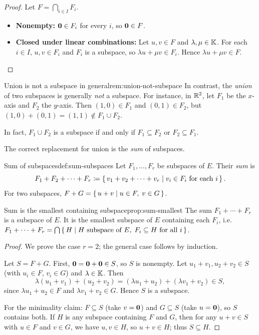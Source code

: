 \begin{proof}
Let $F = \bigcap_{i\in I} F_i$.
\begin{itemize}
  \item \textbf{Nonempty:} $\mathbf{0}\in F_i$ for every $i$, so
    $\mathbf{0}\in F$.
  \item \textbf{Closed under linear combinations:} Let $u,v\in F$ and
    $\lambda,\mu\in{\mathbb{K}}$. For each $i\in I$, $u,v\in F_i$ and $F_i$ is a
    subspace, so $\lambda u+\mu v\in F_i$. Hence
    $\lambda u+\mu v\in F$. \qedhere
\end{itemize}
\end{proof}

\begin{remark}{Union is not a subspace in general}{rem:union-not-subspace}
In contrast, the \emph{union} of two subspaces is generally \emph{not}
a subspace. For instance, in ${\mathbb{R}}^2$, let $F_1$ be the $x$-axis and $F_2$
the $y$-axis. Then $(1,0)\in F_1$ and $(0,1)\in F_2$, but
$(1,0)+(0,1)=(1,1)\notin F_1\cup F_2$.

In fact, $F_1\cup F_2$ is a subspace if and only if $F_1\subseteq F_2$
or $F_2\subseteq F_1$.
\end{remark}

The correct replacement for union is the \emph{sum} of subspaces.

\begin{definition}{Sum of subspaces}{def:sum-subspaces}
Let $F_1,\ldots,F_r$ be subspaces of $E$. Their \emph{sum} is
\[
  F_1 + F_2 + \cdots + F_r \coloneqq
  \left\{\,v_1 + v_2 + \cdots + v_r\;\middle|\;v_i\in F_i \text{ for each } i\,\right\}.
\]
For two subspaces, $F+G = \left\{\,u+v\;\middle|\;u\in F,\;v\in G\,\right\}$.
\end{definition}

\begin{proposition}{Sum is the smallest containing subspace}{prop:sum-smallest}
The sum $F_1+\cdots+F_r$ is a subspace of $E$. It is the smallest
subspace of $E$ containing each $F_i$, i.e.\
$F_1+\cdots+F_r = \bigcap\left\{\,H\;\middle|\;H \text{ subspace of } E,\;
F_i\subseteq H \text{ for all } i\,\right\}$.
\end{proposition}

\begin{proof}
We prove the case $r=2$; the general case follows by induction.

Let $S = F + G$. First, $\mathbf{0} = \mathbf{0} + \mathbf{0}\in S$, so $S$ is
nonempty. Let $u_1+v_1, u_2+v_2\in S$ (with $u_i\in F$, $v_i\in G$) and
$\lambda\in{\mathbb{K}}$. Then
\[
  \lambda(u_1+v_1)+(u_2+v_2) = (\lambda u_1+u_2)+(\lambda v_1+v_2)\in S,
\]
since $\lambda u_1+u_2\in F$ and $\lambda v_1+v_2\in G$. Hence $S$ is a
subspace.

For the minimality claim: $F\subseteq S$ (take $v=\mathbf{0}$) and
$G\subseteq S$ (take $u=\mathbf{0}$), so $S$ contains both. If $H$ is any
subspace containing $F$ and $G$, then for any $u+v\in S$ with $u\in F$
and $v\in G$, we have $u,v\in H$, so $u+v\in H$; thus $S\subseteq H$.
\end{proof}



